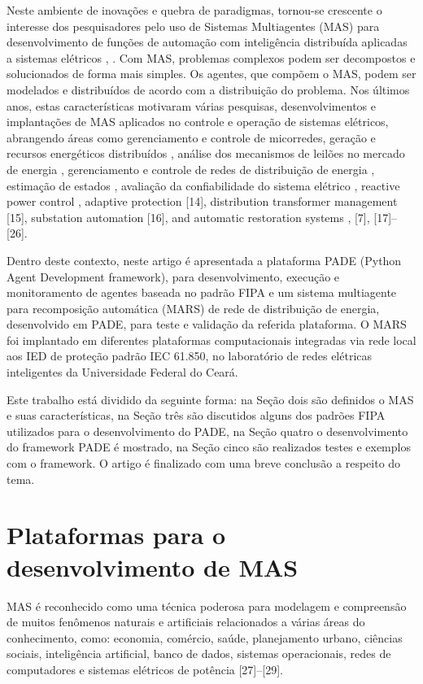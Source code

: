 \documentclass[journal]{IEEEtran}
\begin{document}
Neste ambiente de inovações e quebra de paradigmas, tornou-se crescente o interesse dos pesquisadores pelo uso de Sistemas Multiagentes (MAS) para desenvolvimento de funções de automação com inteligência distribuída aplicadas a sistemas elétricos \cite{ref:6}, \cite{ref:7}. Com MAS, problemas complexos podem ser decompostos e solucionados de forma mais simples. Os agentes, que compõem o MAS, podem ser modelados e distribuídos de acordo com a distribuição do problema. Nos últimos anos, estas características motivaram várias pesquisas, desenvolvimentos e implantações de MAS aplicados no controle e operação de sistemas elétricos, abrangendo áreas como gerenciamento e controle de micorredes, geração e recursos energéticos distribuídos \cite{ref:8}, análise dos mecanismos de leilões no mercado de energia \cite{ref:9}, gerenciamento e controle de redes de distribuição de energia \cite{ref:10}, estimação de estados \cite{ref:11}, avaliação da confiabilidade do sistema elétrico \cite{ref:12}, reactive power control \cite{ref:13}, adaptive protection [14], distribution transformer management [15], substation automation [16], and automatic restoration systems \cite{ref:6}, [7], [17]–[26]. 

Dentro deste contexto, neste artigo é apresentada a plataforma PADE (Python Agent Development framework), para desenvolvimento, execução e monitoramento de agentes baseada no padrão FIPA e um sistema multiagente para recomposição automática (MARS) de rede de distribuição de energia, desenvolvido em PADE, para teste e validação da referida plataforma. O MARS foi implantado em diferentes plataformas computacionais integradas via rede local aos IED de proteção padrão IEC 61.850, no laboratório de redes elétricas inteligentes da Universidade Federal do Ceará.

Este trabalho está dividido da seguinte forma: na Seção dois são definidos o MAS e suas características, na Seção três são discutidos alguns dos padrões FIPA utilizados para o desenvolvimento do PADE, na Seção quatro o desenvolvimento do framework PADE é mostrado, na Seção cinco são realizados testes e exemplos com o framework. O artigo é finalizado com uma breve conclusão a respeito do tema.

\section{Plataformas para o desenvolvimento de MAS}

MAS é reconhecido como uma técnica poderosa para modelagem e compreensão de muitos fenômenos naturais e artificiais relacionados a várias áreas do conhecimento, como: economia, comércio, saúde, planejamento urbano, ciências sociais, inteligência artificial, banco de dados, sistemas operacionais, redes de computadores e sistemas elétricos de potência [27]–[29].
\end{document}
